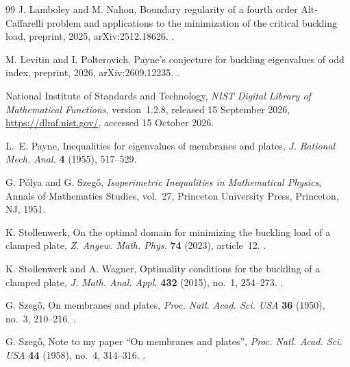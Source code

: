 \documentclass[11pt,letterpaper,reqno]{amsart}
\theoremstyle{definition}
\begin{document}
\begin{thebibliography}{99}
J. Lamboley and M. Nahon,
Boundary regularity of a fourth order Alt-Caffarelli problem and
applications to the minimization of the critical buckling load,
preprint, 2025, arXiv:2512.18626.
.

M. Levitin and I. Polterovich,
Payne's conjecture for buckling eigenvalues of odd index,
preprint, 2026, arXiv:2609.12235.
.

National Institute of Standards and Technology,
\emph{NIST Digital Library of Mathematical Functions},
version~1.2.8, released 15 September 2026,
\url{https://dlmf.nist.gov/}, accessed 15 October 2026.

L.~E. Payne,
Inequalities for eigenvalues of membranes and plates,
\emph{J. Rational Mech. Anal.} \textbf{4} (1955), 517--529.

G. P\'olya and G. Szeg\H{o},
\emph{Isoperimetric Inequalities in Mathematical Physics},
Annals of Mathematics Studies, vol.~27,
Princeton University Press, Princeton, NJ, 1951.

K. Stollenwerk,
On the optimal domain for minimizing the buckling load of a clamped plate,
\emph{Z. Angew. Math. Phys.} \textbf{74} (2023), article~12.
.

K. Stollenwerk and A. Wagner,
Optimality conditions for the buckling of a clamped plate,
\emph{J. Math. Anal. Appl.} \textbf{432} (2015), no.~1, 254--273.
.

G. Szeg\H{o},
On membranes and plates,
\emph{Proc. Natl. Acad. Sci. USA} \textbf{36} (1950), no.~3, 210--216.
.

G. Szeg\H{o},
Note to my paper ``On membranes and plates'',
\emph{Proc. Natl. Acad. Sci. USA} \textbf{44} (1958), no.~4, 314--316.
.

\end{thebibliography}
\end{document}
